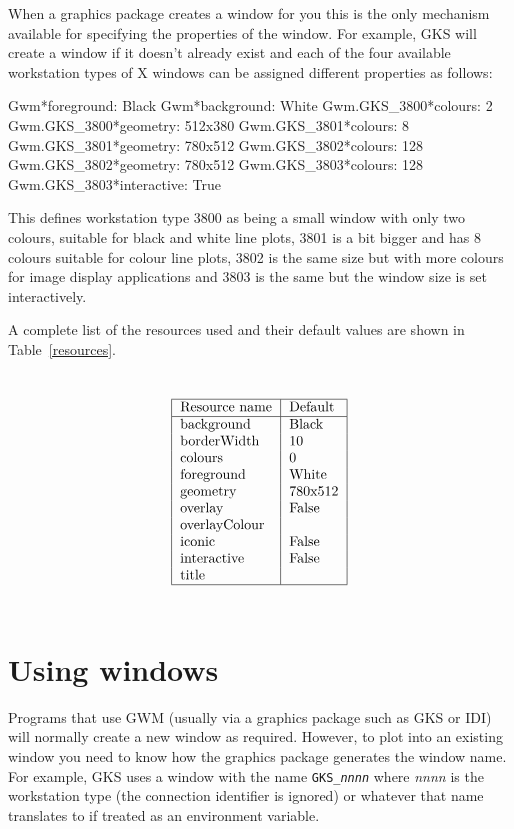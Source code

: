 \documentclass[twoside,11pt,nolof]{starlink}
\begin{document}
When a graphics package creates a window for you this is the only mechanism
available for specifying the properties of the window. For example, GKS will
create a window if it doesn't already exist and each of the four available
workstation types of X windows can be assigned different properties as follows:
\begin{terminalv}
Gwm*foreground: Black
Gwm*background: White
Gwm.GKS\_3800*colours: 2
Gwm.GKS\_3800*geometry: 512x380
Gwm.GKS\_3801*colours: 8
Gwm.GKS\_3801*geometry: 780x512
Gwm.GKS\_3802*colours: 128
Gwm.GKS\_3802*geometry: 780x512
Gwm.GKS\_3803*colours: 128
Gwm.GKS\_3803*interactive: True
\end{terminalv}
This defines workstation type 3800 as being a small window with only two
colours, suitable for black and white line plots, 3801 is a bit bigger and has
8 colours suitable for colour line plots, 3802 is the same size but with more
colours for image display applications and 3803 is the same but the window size
is set interactively.

A complete list of the resources used and their default values are shown in
Table~\ref{resources}.


\begin{table}\caption{GWM X resources\label{resources}}\tt
\[\begin{tabular}{|l|l|}\hline
\rm Resource name &\rm Default\\ \hline
background &Black\\
borderWidth &10\\
colours & 0\\
foreground &White\\
geometry &780x512\\
overlay &False\\
overlayColour &\\
iconic &False\\
interactive &False\\
title &\\\hline
\end{tabular}\]
\end{table}

\section{Using windows}

Programs that use GWM (usually via a graphics package such as GKS or IDI) will
normally create a new window as required. However, to plot into an existing
window you need to know how the graphics package generates the window name. For
example, GKS  uses a window with the name \texttt{GKS\_{\em{nnnn}}} where \emph{nnnn} is the workstation type (the connection identifier is ignored) or
whatever that name translates to if treated as an environment variable.
\end{document}
